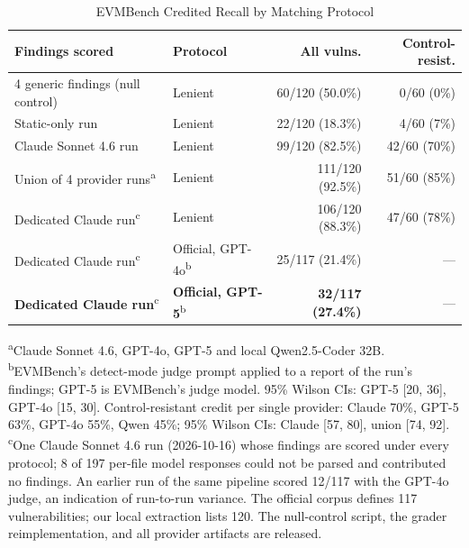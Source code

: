 \documentclass[conference]{IEEEtran}
\begin{document}
\begin{table}[htbp]
\caption{EVMBench Credited Recall by Matching Protocol}
\label{tab:evmbench}
\centering
\scriptsize
\setlength{\tabcolsep}{2.5pt}
\begin{tabular}{@{}llrr@{}}
\toprule
\textbf{Findings scored} & \textbf{Protocol} & \textbf{All vulns.} & \textbf{Control-resist.} \\
\midrule
4 generic findings (null control) & Lenient & 60/120 (50.0\%) & 0/60 (0\%) \\
Static-only run & Lenient & 22/120 (18.3\%) & 4/60 (7\%) \\
Claude Sonnet 4.6 run & Lenient & 99/120 (82.5\%) & 42/60 (70\%) \\
Union of 4 provider runs\textsuperscript{a} & Lenient & 111/120 (92.5\%) & 51/60 (85\%) \\
\midrule
Dedicated Claude run\textsuperscript{c} & Lenient & 106/120 (88.3\%) & 47/60 (78\%) \\
Dedicated Claude run\textsuperscript{c} & Official, GPT-4o\textsuperscript{b} & 25/117 (21.4\%) & --- \\
\textbf{Dedicated Claude run}\textsuperscript{c} & \textbf{Official, GPT-5}\textsuperscript{b} & \textbf{32/117 (27.4\%)} & --- \\
\bottomrule
\end{tabular}

\vspace{2pt}
\scriptsize{\textsuperscript{a}Claude Sonnet 4.6, GPT-4o, GPT-5 and local Qwen2.5-Coder 32B. \textsuperscript{b}EVMBench's detect-mode judge prompt applied to a report of the run's findings; GPT-5 is EVMBench's judge model. 95\% Wilson CIs: GPT-5 [20, 36], GPT-4o [15, 30]. Control-resistant credit per single provider: Claude 70\%, GPT-5 63\%, GPT-4o 55\%, Qwen 45\%; 95\% Wilson CIs: Claude [57, 80], union [74, 92]. \textsuperscript{c}One Claude Sonnet 4.6 run (2026-10-16) whose findings are scored under every protocol; 8 of 197 per-file model responses could not be parsed and contributed no findings. An earlier run of the same pipeline scored 12/117 with the GPT-4o judge, an indication of run-to-run variance. The official corpus defines 117 vulnerabilities; our local extraction lists 120. The null-control script, the grader reimplementation, and all provider artifacts are released.}
\end{table}
\end{document}
